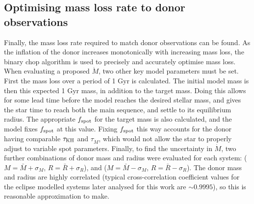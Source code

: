 \subsection{Optimising mass loss rate to donor observations}
\label{sect:modelling:optimising mass loss rate to observations}

Finally, the mass loss rate required to match donor observations can be found. As the inflation of the donor increases monotonically with increasing mass loss, the binary chop algorithm is used to precisely and accurately optimise mass loss.
When evaluating a proposed $\dot M$, two other key model parameters must be set. First the mass loss over a period of 1 Gyr is calculated. The initial model mass is then this expected 1 Gyr mass, in addition to the target mass. Doing this allows for some lead time before the model reaches the desired stellar mass, and gives the star time to reach both the main sequence, and settle to its equilibrium radius.
The appropriate $f_{\rm spot}$ for the target mass is also calculated, and the model fixes $f_{\rm spot}$ at this value. Fixing $f_{\rm spot}$ this way accounts for the donor having comparable $\tau_{\rm KH}$ and $\tau_{\dot M}$, which would not allow the star to properly adjust to variable spot parameters.
Finally, to find the uncertainty in $\dot M$, two further combinations of donor mass and radius were evaluated for each system: ($M = \bar M + \sigma_M$, $R = \bar R + \sigma_R$), and ($M = \bar M - \sigma_M$, $R = \bar R - \sigma_R$). The donor mass and radius are highly correlated (typical cross-correlation coefficient values for the eclipse modelled systems later analysed for this work are $\sim 0.9995$), so this is reasonable approximation to make.

